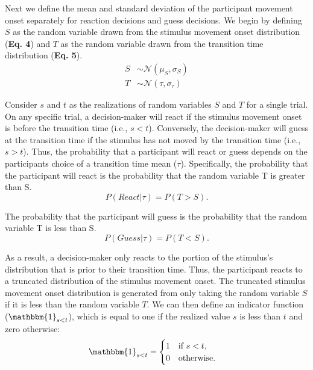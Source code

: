 \documentclass[man,floatsintext,letterpaper,12pt]{apa7}
\newcommand\boldblue[1]{\textcolor{mydarkblue}{\textbf{#1}}}
\begin{document}
Next we define the mean and standard deviation of the participant movement onset separately for reaction decisions and guess decisions. We begin by defining $S$ as the random variable drawn from the stimulus movement onset distribution (\boldblue{Eq. 4}) and $T$ as the random variable drawn from the transition time distribution (\boldblue{Eq. 5}).
\begin{align}
    S & \sim\mathcal{N}(\mu_{S},\sigma_{S}) \\
    T & \sim\mathcal{N}(\tau,\sigma_{\tau})
\end{align}

Consider $s$ and $t$ as the realizations of random variables $S$ and $T$ for a single trial. On any specific trial, a decision-maker will react if the stimulus movement onset is before the transition time (i.e., $s<t$). Conversely, the decision-maker will guess at the transition time if the stimulus has not moved by the transition time (i.e., $s>t$). Thus, the probability that a participant will react or guess depends on the participants choice of a transition time mean ($\tau$). Specifically, the probability that the participant will react is the probability that the random variable T is greater than S.
\begin{equation}
    P(React|\tau) = P(T>S).
\end{equation}

The probability that the participant will guess is the probability that the random variable T is less than S.
\begin{equation}
    P(Guess|\tau) = P(T<S).
\end{equation}

As a result, a decision-maker only reacts to the portion of the stimulus’s distribution that is prior to their transition time. Thus, the participant reacts to a truncated distribution of the stimulus movement onset. The truncated stimulus movement onset distribution is generated from only taking the random variable $S$ if it is less than the random variable $T$. We can then define an indicator function ($\mathbbm{1}_{s<t}$), which is equal to one if the realized value $s$ is less than $t$ and zero otherwise:
\begin{align}
     & \mathbbm{1}_{s<t} =
    \begin{cases}
        1 & \text{if } s < t, \\
        0 & \text{otherwise.}
    \end{cases}
\end{align}
\end{document}
